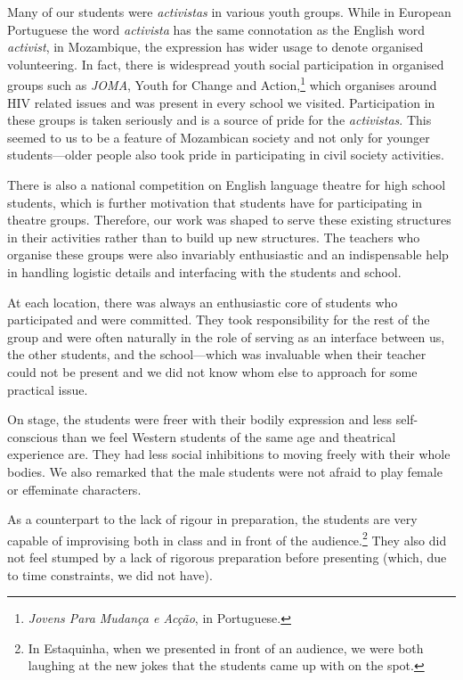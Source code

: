 \documentclass[article,twocolumn,twoside]{memoir}
\begin{document}
Many of our students were \textit{activistas} in various youth groups. While in
European Portuguese the word \textit{activista} has the same connotation as the
English word \textit{activist}, in Mozambique, the expression has wider usage
to denote organised volunteering. In fact, there is widespread youth social
participation in organised groups such as \textit{JOMA}, Youth for Change and
Action,\footnote{\textit{Jovens Para Mudança e Acção}, in Portuguese.} which
organises around HIV related issues and was present in every school we visited.
Participation in these groups is taken seriously and is a source of pride for
the \textit{activistas}. This seemed to us to be a feature of Mozambican
society and not only for younger students---older people also took pride in
participating in civil society activities.

There is also a national competition on English language theatre for high
school students, which is further motivation that students have for
participating in theatre groups. Therefore, our work was shaped to serve these
existing structures in their activities rather than to build up new structures.
The teachers who organise these groups were also invariably enthusiastic and an
indispensable help in handling logistic details and interfacing with the
students and school.

At each location, there was always an enthusiastic core of students who
participated and were committed. They took responsibility for the rest of the
group and were often naturally in the role of serving as an interface between
us, the other students, and the school---which was invaluable when their
teacher could not be present and we did not know whom else to approach for some
practical issue.

On stage, the students were freer with their bodily expression and less
self-conscious than we feel Western students of the same age and theatrical
experience are. They had less social inhibitions to moving freely with their
whole bodies. We also remarked that the male students were not afraid to play
female or effeminate characters.

As a counterpart to the lack of rigour in preparation, the students are
very capable of improvising both in class and in front of the
audience.\footnote{In Estaquinha, when we presented in front of an audience, we
were both laughing at the new jokes that the students came up with on the
spot.} They also did not feel stumped by a lack of rigorous preparation before
presenting (which, due to time constraints, we did not have).
\end{document}
